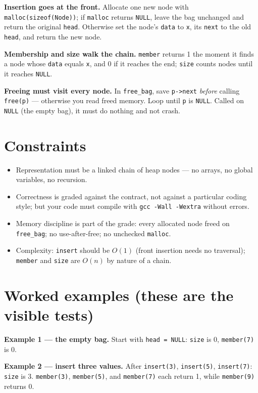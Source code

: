 \documentclass[11pt]{article}
\begin{document}
\textbf{Insertion goes at the front.} Allocate one new node with \texttt{malloc(sizeof(Node))}; if \texttt{malloc} returns \texttt{NULL}, leave the bag unchanged and return the original \texttt{head}. Otherwise set the node's \texttt{data} to \texttt{x}, its \texttt{next} to the old \texttt{head}, and return the new node.

\textbf{Membership and size walk the chain.} \texttt{member} returns 1 the moment it finds a node whose \texttt{data} equals \texttt{x}, and 0 if it reaches the end; \texttt{size} counts nodes until it reaches \texttt{NULL}.

\textbf{Freeing must visit every node.} In \texttt{free\_bag}, save \texttt{p->next} \emph{before} calling \texttt{free(p)} --- otherwise you read freed memory. Loop until \texttt{p} is \texttt{NULL}. Called on \texttt{NULL} (the empty bag), it must do nothing and not crash.

\section{Constraints}

\begin{itemize}
  \item Representation must be a linked chain of heap nodes --- no arrays, no global variables, no recursion.
  \item Correctness is graded against the contract, not against a particular coding style; but your code must compile with \texttt{gcc -Wall -Wextra} without errors.
  \item Memory discipline is part of the grade: every allocated node freed on \texttt{free\_bag}; no use-after-free; no unchecked \texttt{malloc}.
  \item Complexity: \texttt{insert} should be $O(1)$ (front insertion needs no traversal); \texttt{member} and \texttt{size} are $O(n)$ by nature of a chain.
\end{itemize}

\section{Worked examples (these are the visible tests)}

\textbf{Example 1 --- the empty bag.} Start with \texttt{head = NULL}: \texttt{size} is 0, \texttt{member(7)} is 0.

\textbf{Example 2 --- insert three values.} After \texttt{insert(3)}, \texttt{insert(5)}, \texttt{insert(7)}: \texttt{size} is 3. \texttt{member(3)}, \texttt{member(5)}, and \texttt{member(7)} each return 1, while \texttt{member(9)} returns 0.
\end{document}
